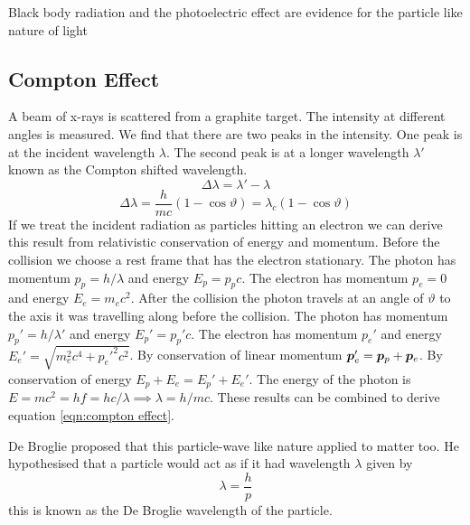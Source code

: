 \documentclass{article}
\begin{document}
    Black body radiation and the photoelectric effect are evidence for the particle like nature of light
    
    \subsection{Compton Effect}
    A beam of x-rays is scattered from a graphite target.
    The intensity at different angles is measured.
    We find that there are two peaks in the intensity.
    One peak is at the incident wavelength \(\lambda\).
    The second peak is at a longer wavelength \(\lambda'\) known as the Compton shifted wavelength.
    \[\Delta\lambda = \lambda' - \lambda\]
    \begin{equation}\label{eqn:compton effect}
        \Delta\lambda = \frac{h}{mc}(1 - \cos\vartheta) = \lambda_c(1 - \cos\vartheta)
    \end{equation}
    If we treat the incident radiation as particles hitting an electron we can derive this result from relativistic conservation of energy and momentum.
    Before the collision we choose a rest frame that has the electron stationary.
    The photon has momentum \(p_p = h/\lambda\) and energy \(E_p = p_pc\).
    The electron has momentum \(p_e = 0\) and energy \(E_e = m_ec^2\).
    After the collision the photon travels at an angle of \(\vartheta\) to the axis it was travelling along before the collision.
    The photon has momentum \(p_p' = h/\lambda'\) and energy \(E_p' = p_p'c\).
    The electron has momentum \(p_e'\) and energy \(E_e' = \sqrt{m_e^2c^4 + p_e'^2c^2}\).
    By conservation of linear momentum \(\bm{p}_e' = \bm{p}_p + \bm{p}_e\).
    By conservation of energy \(E_p + E_e = E_p' + E_e'\).
    The energy of the photon is \(E = mc^2 = hf = hc/\lambda\implies \lambda = h/mc\).
    These results can be combined to derive equation \ref{eqn:compton effect}.
    
    De Broglie proposed that this particle-wave like nature applied to matter too.
    He hypothesised that a particle would act as if it had wavelength \(\lambda\) given by
    \[\lambda = \frac{h}{p}\]
    this is known as the De Broglie wavelength of the particle.
    
\end{document}
